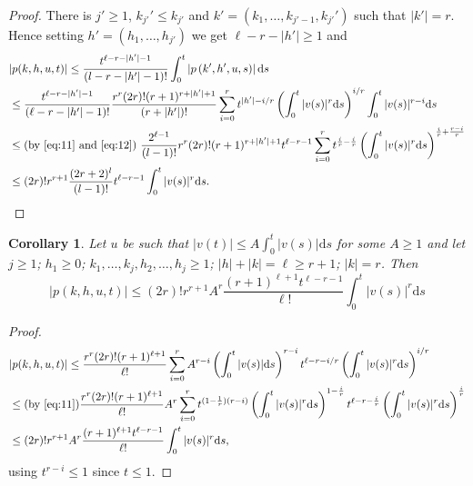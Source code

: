\documentclass{article}
\newtheorem{corollary}{Corollary}[section]
\newcommand{\dd}{\mathrm{d}}
\begin{document}
\begin{proof}
	There is $j' \geq 1$, $k_{j'}' \leq k_{j'}$ and $k'=\left(k_1, \ldots, k_{j'-1}, k_{j'}'\right)$ such that $\left|k'\right|=r$. 
	Hence setting $h'=\left(h_1, \ldots, h_{j'}\right)$ we get $\ell-r-|h'| \geq 1$ and
	\begin{equation*}
		\begin{aligned}
			& |p(k, h, u, t)| \leq \frac{t^{\ell-r-|h'|-1}}{\left(l-r-|h'|-1\right) !} \int_0^t\left|p\left(k', h', u, s\right)\right| \dd s \\
			& \leq \frac{t^{\ell-r-|h'|-1}}{\left(\ell-r-|h'|-1\right) !} \frac{r^r (2 r)! (r+1)^{r+|h'|+1}}{\left(r+|h'|\right) !} \sum_{i=0}^r t^{|h'|-i / r}\left(\int_0^t|v(s)|^r \dd s\right)^{i / r} \int_0^t|v(s)|^{r-i} \dd s \\
			& \leq \text {(by \eqref{eq:11} and \eqref{eq:12}) } \frac{2^{\ell-1}}{(l-1) !} r^r (2 r) !(r+1)^{r+|h'|+1} t^{\ell-r-1} \sum_{i=0}^r t^{\frac{i}{r} - \frac{i}{r}}\left(\int_0^t|v(s)|^r \dd s\right)^{\frac{i}{r} + \frac{r-i}{r}}  \\
			& \leq (2 r) ! r^{r+1} \frac{(2 r+2)^l}{(l-1) !} t^{\ell-r-1} \int_0^t|v(s)|^r \dd s.
		\end{aligned}
		\qedhere
	\end{equation*}
\end{proof}

\begin{corollary}
	Let $u$ be such that $|v(t)| \leq A \int_0^t|v(s)| \dd s$ for some $A \geq 1$ and let $j \geq 1$; $h_1 \geq 0$; $k_1, \ldots, k_j, h_2, \ldots, h_j \geq 1$; $|h|+|k|=\ell \geq r+1$; $|k|=r$. 
	Then
	\begin{equation}
		\label{eq:14}
		|p(k, h, u, t)| \leq (2 r) ! r^{r+1} A^r \frac{(r+1)^{\ell+1} t^{\ell-r-1}}{\ell !} \int_0^t|v(s)|^r \dd s
	\end{equation}
\end{corollary}

\begin{proof}
	\begin{equation*}
		\begin{split}
			& |p(k, h, u, t)| \leq \frac{r^r (2 r) !(r+1)^{\ell+1}}{\ell !} \sum_{i=0}^r A^{r-i}\left(\int_0^t|v(s)| \dd s\right)^{r-i} t^{\ell-r-i / r}\left(\int_0^t|v(s)|^r \dd s\right)^{i / r} \\
			& \leq (\text{by \eqref{eq:11}}) \frac{r^r (2 r) !(r+1)^{\ell+1}}{\ell !} A^r \sum_{i=0}^r t^{(1-\frac 1 r)(r-i)}\left(\int_0^t|v(s)|^r \dd s\right)^{1-\frac i r} t^{\ell-r-\frac i r}\left(\int_0^t|v(s)|^r \dd s\right)^{\frac i r} \\
			& \leq (2 r) ! r^{r+1} A^r \frac{(r+1)^{\ell+1} t^{\ell-r-1}}{\ell !} \int_0^t|v(s)|^r \dd s,
		\end{split}
	\end{equation*}
	using $t^{r-i} \leq 1$ since $t \leq 1$.
\end{proof}
\end{document}
